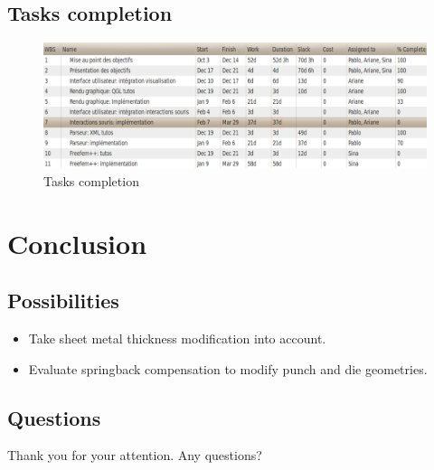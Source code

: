 \documentclass{beamer}
\begin{document}
\subsection{Tasks completion}
\begin{frame}
    \begin{figure}
        \includegraphics[width=\textwidth]{img/ganttCompletionTasks.png}
        \caption{Tasks completion}
        \label{Complétion}
    \end{figure}
\end{frame}

\section{Conclusion}
\subsection{Possibilities}
\begin{frame}
    \begin{itemize}
        \item Take sheet metal thickness modification into account.
        \item Evaluate springback compensation to modify punch and die geometries.
    \end{itemize}
\end{frame}
\subsection{Questions}
\begin{frame}
    Thank you for your attention.
    \hfill Any questions?
\end{frame}
\end{document}

